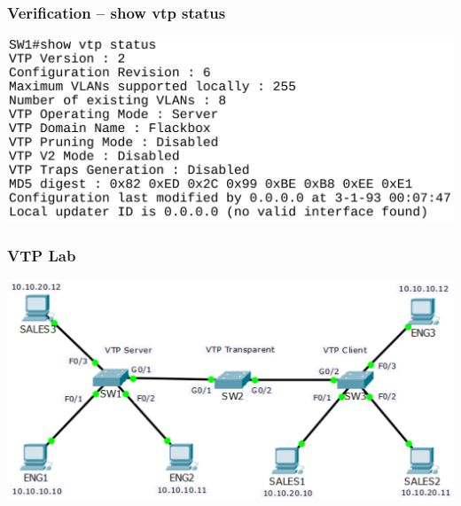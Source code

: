 \documentclass[pdflatex,compress,mathserif]{beamer}
\begin{document}
\begin{frame}
	\frametitle{Verification – show vtp status}
	\begin{center}
		\includegraphics[width=\linewidth]{img/img44}
	\end{center}
\end{frame}

\begin{frame}
	\frametitle{VTP Lab}
	\begin{center}
		\includegraphics[width=\linewidth]{img/img45}
	\end{center}
\end{frame}
\end{document}
